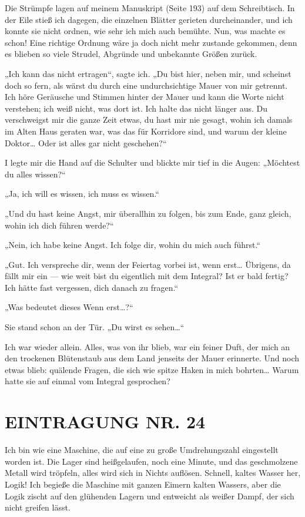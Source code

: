 Die Strümpfe lagen auf meinem Manuskript (Seite 193) auf dem
Schreibtisch. In der Eile stieß ich dagegen, die einzelnen Blätter
gerieten durcheinander, und ich konnte sie nicht ordnen, wie sehr
ich mich auch bemühte. Nun, was machte es schon! Eine richtige
Ordnung wäre ja doch nicht mehr zustande gekommen, denn es blieben
so viele Strudel, Abgründe und unbekannte Größen zurück.

„Ich kann
das nicht ertragen“, sagte ich. „Du bist hier, neben mir, und
scheinst doch so fern, als wärst du durch eine undurchsichtige
Mauer von mir getrennt. Ich höre Geräusche und Stimmen hinter der
Mauer und kann die Worte nicht verstehen; ich weiß nicht, was dort
ist. Ich halte das nicht länger aus. Du verschweigst mir die ganze
Zeit etwas, du hast mir nie gesagt, wohin ich damals im Alten Haus
geraten war, was das für Korridore sind, und warum der kleine
Doktor\ldots{} Oder ist alles gar nicht geschehen?“

I legte mir die Hand auf die Schulter und blickte mir tief in die
Augen: „Möchtest du alles wissen?“

„Ja, ich will es wissen, ich muss es wissen.“

„Und du hast keine Angst, mir überallhin zu
folgen, bis zum Ende, ganz gleich, wohin ich dich führen werde?“

„Nein, ich habe keine Angst. Ich folge dir, wohin du mich auch
führst.“

„Gut. Ich verspreche dir, wenn der Feiertag vorbei ist, wenn
erst\ldots{} Übrigens, da fällt mir ein — wie weit bist du eigentlich
mit dem Integral? Ist er bald fertig? Ich hätte fast vergessen,
dich danach zu fragen.“

„Was bedeutet dieses \glq{}Wenn erst\ldots{}\grq{}?“

Sie stand schon an der Tür. „Du wirst es
sehen\ldots{}“

Ich war wieder allein. Alles, was von ihr blieb, war ein
feiner Duft, der mich an den trockenen Blütenstaub aus dem Land
jenseits der Mauer erinnerte. Und noch etwas blieb: quälende
Fragen, die sich wie spitze Haken in mich bohrten\ldots{} Warum hatte
sie auf einmal vom Integral gesprochen?

\section{EINTRAGUNG NR. 24}

Ich bin wie eine Maschine, die auf eine zu große Umdrehungszahl
eingestellt worden ist. Die Lager sind heißgelaufen, noch eine
Minute, und das geschmolzene Metall wird tröpfeln, alles wird sich
in Nichts auflösen. Schnell, kaltes Wasser her, Logik! Ich begieße
die Maschine mit ganzen Eimern kalten Wassers, aber die Logik
zischt auf den glühenden Lagern und entweicht als weißer Dampf, der
sich nicht greifen lässt.


